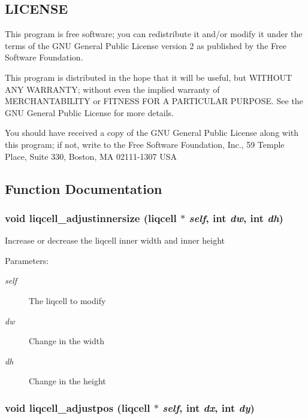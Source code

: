 \subsection{LICENSE}\label{de/d77/liqui_8c_LICENSE}
This program is free software; you can redistribute it and/or modify it under the terms of the GNU General Public License version 2 as published by the Free Software Foundation.

This program is distributed in the hope that it will be useful, but WITHOUT ANY WARRANTY; without even the implied warranty of MERCHANTABILITY or FITNESS FOR A PARTICULAR PURPOSE. See the GNU General Public License for more details.

You should have received a copy of the GNU General Public License along with this program; if not, write to the Free Software Foundation, Inc., 59 Temple Place, Suite 330, Boston, MA 02111-1307 USA 

\subsection{Function Documentation}
\subsubsection[{liqcell\_\-adjustinnersize}]{\setlength{\rightskip}{0pt plus 5cm}void liqcell\_\-adjustinnersize (liqcell $\ast$ {\em self}, \/  int {\em dw}, \/  int {\em dh})}\label{d5/da2/liqcell_8c_43f97de0c4ed635784d01d0ab49c5c3b}


Increase or decrease the liqcell inner width and inner height \begin{Desc}
\item[Parameters:]
\begin{description}
\item[{\em self}]The liqcell to modify \item[{\em dw}]Change in the width \item[{\em dh}]Change in the height \end{description}
\end{Desc}
\subsubsection[{liqcell\_\-adjustpos}]{\setlength{\rightskip}{0pt plus 5cm}void liqcell\_\-adjustpos (liqcell $\ast$ {\em self}, \/  int {\em dx}, \/  int {\em dy})}\label{d5/da2/liqcell_8c_f19ddc03ffabda4c6cd3d627beeaca50}


